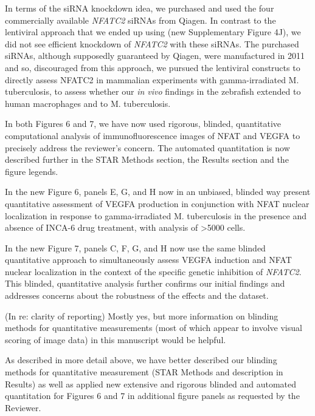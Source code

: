 \begin{description}[style=multiline, labelwidth=\widthof{Reviewer \#2:   }, font=\normalfont, leftmargin=\labelwidth, align=right]
\item \quad In terms of the siRNA knockdown idea, we purchased and used the four commercially available \textit{NFATC2} siRNAs from Qiagen. In contrast to the lentiviral approach that we ended up using (new Supplementary Figure 4J), we did not see efficient knockdown of \textit{NFATC2} with these siRNAs. The purchased siRNAs, although supposedly guaranteed by Qiagen, were manufactured in 2011 and so, discouraged from this approach, we pursued the lentiviral constructs to directly assess NFATC2 in mammalian experiments with gamma\hyp{}irradiated M. tuberculosis, to assess whether our \textit{in vivo} findings in the zebrafish extended to human macrophages and to M. tuberculosis.

\item \quad In both Figures 6 and 7, we have now used rigorous, blinded, quantitative computational analysis of immunofluorescence images of NFAT and VEGFA to precisely address the reviewer’s concern. The automated quantitation is now described further in the STAR Methods section, the Results section and the figure legends. 

\item \quad In the new Figure 6, panels E, G, and H now in an unbiased, blinded way present quantitative assessment of VEGFA production in conjunction with NFAT nuclear localization in response to gamma\hyp{}irradiated M. tuberculosis in the presence and absence of INCA\hyp{}6 drug treatment, with analysis of >5000 cells. 

\item \quad In the new Figure 7, panels C, F, G, and H now use the same blinded quantitative approach to simultaneously assess VEGFA induction and NFAT nuclear localization in the context of the specific genetic inhibition of \textit{NFATC2}. This blinded, quantitative analysis further confirms our initial findings and addresses concerns about the robustness of the effects and the dataset.

\item[Reviewer \#2: ] \quad (In re: clarity of reporting) Mostly yes, but more information on blinding methods for quantitative measurements (most of which appear to involve visual scoring of image data) in this manuscript would be helpful.

\item[Response: ] \quad As described in more detail above, we have better described our blinding methods for quantitative measurement (STAR Methods and description in Results) as well as applied new extensive and rigorous blinded and automated quantitation for Figures 6 and 7 in additional figure panels as requested by the Reviewer.

\end{description}